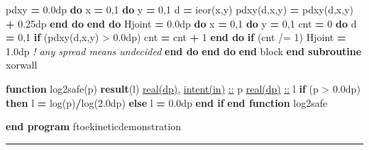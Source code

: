 \documentclass[10pt]{article}
\renewcommand{\_}{\origunderscore\allowbreak}
\newenvironment{Shaded}{}{}
\newcommand{\BuiltInTok}[1]{#1}
\newcommand{\CommentTok}[1]{\textit{#1}}
\newcommand{\DataTypeTok}[1]{\underline{#1}}
\newcommand{\DecValTok}[1]{#1}
\newcommand{\FloatTok}[1]{#1}
\newcommand{\KeywordTok}[1]{\textbf{#1}}
\newcommand{\NormalTok}[1]{#1}
\newcommand{\OperatorTok}[1]{#1}
\begin{document}
\begin{Shaded}
\begin{Highlighting}[]
\NormalTok{      pdxy }\KeywordTok{=} \FloatTok{0.0\_dp}
      \KeywordTok{do}\NormalTok{ x }\KeywordTok{=} \DecValTok{0}\NormalTok{,}\DecValTok{1}
         \KeywordTok{do}\NormalTok{ y }\KeywordTok{=} \DecValTok{0}\NormalTok{,}\DecValTok{1}
\NormalTok{            d }\KeywordTok{=} \BuiltInTok{ieor}\NormalTok{(x,y)}
\NormalTok{            pdxy(d,x,y) }\KeywordTok{=}\NormalTok{ pdxy(d,x,y) }\KeywordTok{+} \FloatTok{0.25\_dp}
         \KeywordTok{end do}
      \KeywordTok{end do}
\NormalTok{      H\_joint }\KeywordTok{=} \FloatTok{0.0\_dp}
      \KeywordTok{do}\NormalTok{ x }\KeywordTok{=} \DecValTok{0}\NormalTok{,}\DecValTok{1}
         \KeywordTok{do}\NormalTok{ y }\KeywordTok{=} \DecValTok{0}\NormalTok{,}\DecValTok{1}
\NormalTok{            cnt }\KeywordTok{=} \DecValTok{0}
            \KeywordTok{do}\NormalTok{ d }\KeywordTok{=} \DecValTok{0}\NormalTok{,}\DecValTok{1}
               \KeywordTok{if}\NormalTok{ (pdxy(d,x,y) }\OperatorTok{\textgreater{}} \FloatTok{0.0\_dp}\NormalTok{) cnt }\KeywordTok{=}\NormalTok{ cnt }\KeywordTok{+} \DecValTok{1}
            \KeywordTok{end do}
            \KeywordTok{if}\NormalTok{ (cnt }\OperatorTok{/=} \DecValTok{1}\NormalTok{) H\_joint }\KeywordTok{=} \FloatTok{1.0\_dp}   \CommentTok{! any spread means undecided}
         \KeywordTok{end do}
      \KeywordTok{end do}
    \KeywordTok{end}\NormalTok{ block}
  \KeywordTok{end subroutine}\NormalTok{ xor\_wall}

  \KeywordTok{function}\NormalTok{ log2safe(p) }\KeywordTok{result}\NormalTok{(l)}
    \DataTypeTok{real(dp)}\NormalTok{, }\DataTypeTok{intent(in)} \DataTypeTok{::}\NormalTok{ p}
    \DataTypeTok{real(dp)} \DataTypeTok{::}\NormalTok{ l}
    \KeywordTok{if}\NormalTok{ (p }\OperatorTok{\textgreater{}} \FloatTok{0.0\_dp}\NormalTok{) }\KeywordTok{then}
\NormalTok{       l }\KeywordTok{=} \BuiltInTok{log}\NormalTok{(p)}\KeywordTok{/}\BuiltInTok{log}\NormalTok{(}\FloatTok{2.0\_dp}\NormalTok{)}
    \KeywordTok{else}
\NormalTok{       l }\KeywordTok{=} \FloatTok{0.0\_dp}
    \KeywordTok{end if}
  \KeywordTok{end function}\NormalTok{ log2safe}

\KeywordTok{end program}\NormalTok{ ftoe\_kinetic\_demonstration}
\end{Highlighting}
\end{Shaded}

\begin{center}\rule{0.5\linewidth}{0.5pt}\end{center}
\end{document}
